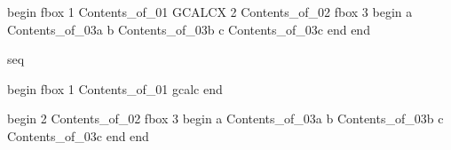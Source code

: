 begin
fbox 1
Contents_of_01
GCALCX
2
Contents_of_02
fbox 3
begin
a
Contents_of_03a
b
Contents_of_03b
c
Contents_of_03c
end
end

seq

begin
fbox 1
Contents_of_01
gcalc
end

begin
2
Contents_of_02
fbox 3
begin
a
Contents_of_03a
b
Contents_of_03b
c
Contents_of_03c
end
end

